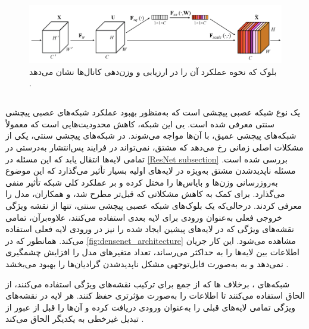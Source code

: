 \begin{figure}[h!]
    \centering
    \includegraphics[width=1\textwidth]{Images/Chapter2/squeeze and excitation.png}
    \caption{بلوک  که نحوه عملکرد آن را در ارزیابی و وزن‌دهی کانال‌ها نشان می‌دهد \cite{hu2018squeeze}.}
    \label{fig:se_block}
\end{figure}




\subsection{}

یک نوع شبکه‌ عصبی پیچشی است که به‌منظور بهبود عملکرد شبکه‌های عصبی پیچشی سنتی معرفی شده ‌است. یی این شبکه، کاهش محدودیت‌هایی است که معمولاً شبکه‌های پیچشی عمیق، با آن‌ها مواجه می‌شوند.
در شبکه‌های پیچشی سنتی، یکی از مشکلات اصلی زمانی رخ می‌دهد که مشتق، نمی‌تواند در فرایند پس‌انتشار به‌درستی در تمامی لایه‌ها انتقال یابد که این مسئله در
\autoref{ResNet subsection}
بررسی شده است. مسئله ناپدیدشدن مشتق به‌ویژه در لایه‌های اولیه بسیار تأثیر می‌گذارد که این موضوع به‌روزرسانی وزن‌ها و بایاس‌ها را مختل کرده و بر عملکرد کلی شبکه تأثیر منفی می‌گذارد.
برای کمک به کاهش مشکلاتی که قبل‌تر مطرح شد،
\cite{huang2017densely}
و همکاران، مدل 
 ‌را معرفی کردند. درحالی‌که یک بلوک‌های شبکه عصبی پیچشی‌ سنتی، تنها از نقشه ویژگی خروجی فعلی به‌عنوان ورودی برای لایه بعدی استفاده می‌کنند،
   علاوه‌برآن، تمامی نقشه‌های ویژگی که در لایه‌های پیشین ایجاد شده را نیز در ورودی لایه فعلی استفاده می‌کند. همانطور که در \autoref{fig:densenet_architecture} مشاهده می‌شود. این کار جریان اطلاعات بین لایه‌ها را به حداکثر می‌رساند، تعداد متغیرهای مدل را افزایش چشمگیری نمی‌دهد و به به‌صورت قابل‌توجهی مشکل ناپدیدشدن گرادیان‌ها را بهبود می‌بخشد .

شبکه‌های 
،
 برخلاف
  ها
که از جمع برای ترکیب نقشه‌های ویژگی استفاده می‌کنند، از الحاق 
   استفاده می‌کنند تا اطلاعات را به‌صورت مؤثرتری حفظ کنند. هر لایه در
    نقشه‌های ویژگی تمامی لایه‌های قبلی را به‌عنوان ورودی دریافت کرده و آن‌ها را قبل از عبور از تبدیل غیرخطی به یکدیگر الحاق می‌کند \cite{huang2017densely}.

